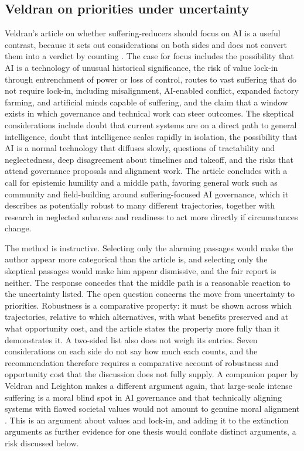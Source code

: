 \documentclass[11pt]{article}
\begin{document}
\subsection{Veldran on priorities under uncertainty}

Veldran's article on whether suffering-reducers should focus on AI is a useful contrast, because it sets out considerations on both sides and does not convert them into a verdict by counting \citep{veldran2026crs}. The case for focus includes the possibility that AI is a technology of unusual historical significance, the risk of value lock-in through entrenchment of power or loss of control, routes to vast suffering that do not require lock-in, including misalignment, AI-enabled conflict, expanded factory farming, and artificial minds capable of suffering, and the claim that a window exists in which governance and technical work can steer outcomes. The skeptical considerations include doubt that current systems are on a direct path to general intelligence, doubt that intelligence scales rapidly in isolation, the possibility that AI is a normal technology that diffuses slowly, questions of tractability and neglectedness, deep disagreement about timelines and takeoff, and the risks that attend governance proposals and alignment work. The article concludes with a call for epistemic humility and a middle path, favoring general work such as community and field-building around suffering-focused AI governance, which it describes as potentially robust to many different trajectories, together with research in neglected subareas and readiness to act more directly if circumstances change.

The method is instructive. Selecting only the alarming passages would make the author appear more categorical than the article is, and selecting only the skeptical passages would make him appear dismissive, and the fair report is neither. The response concedes that the middle path is a reasonable reaction to the uncertainty listed. The open question concerns the move from uncertainty to priorities. Robustness is a comparative property: it must be shown across which trajectories, relative to which alternatives, with what benefits preserved and at what opportunity cost, and the article states the property more fully than it demonstrates it. A two-sided list also does not weigh its entries. Seven considerations on each side do not say how much each counts, and the recommendation therefore requires a comparative account of robustness and opportunity cost that the discussion does not fully supply. A companion paper by Veldran and Leighton makes a different argument again, that large-scale intense suffering is a moral blind spot in AI governance and that technically aligning systems with flawed societal values would not amount to genuine moral alignment \citep{veldran2026}. This is an argument about values and lock-in, and adding it to the extinction arguments as further evidence for one thesis would conflate distinct arguments, a risk discussed below.
\end{document}
